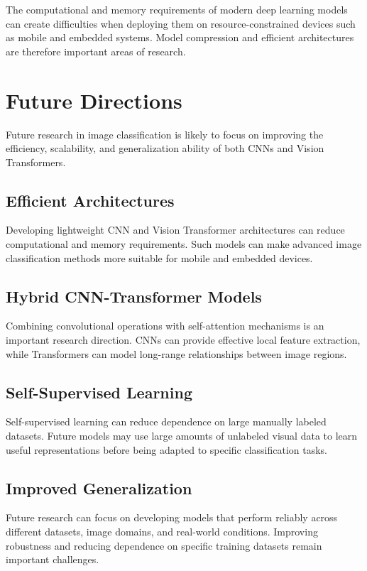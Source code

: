 \documentclass[conference]{IEEEtran}
\begin{document}
The computational and memory requirements of modern deep learning models can create difficulties when deploying them on resource-constrained devices such as mobile and embedded systems. Model compression and efficient architectures are therefore important areas of research.

\section{Future Directions}

Future research in image classification is likely to focus on improving the efficiency, scalability, and generalization ability of both CNNs and Vision Transformers.

\subsection{Efficient Architectures}

Developing lightweight CNN and Vision Transformer architectures can reduce computational and memory requirements. Such models can make advanced image classification methods more suitable for mobile and embedded devices.

\subsection{Hybrid CNN-Transformer Models}

Combining convolutional operations with self-attention mechanisms is an important research direction. CNNs can provide effective local feature extraction, while Transformers can model long-range relationships between image regions.

\subsection{Self-Supervised Learning}

Self-supervised learning can reduce dependence on large manually labeled datasets. Future models may use large amounts of unlabeled visual data to learn useful representations before being adapted to specific classification tasks.

\subsection{Improved Generalization}

Future research can focus on developing models that perform reliably across different datasets, image domains, and real-world conditions. Improving robustness and reducing dependence on specific training datasets remain important challenges.
\end{document}
